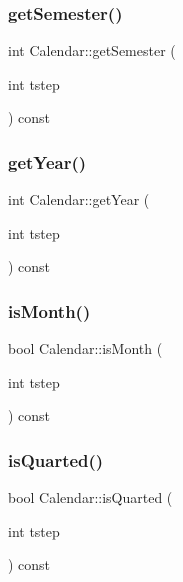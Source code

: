 \subsubsection{\texorpdfstring{getSemester()}{getSemester()}}
{\footnotesize\ttfamily int Calendar\+::get\+Semester (\begin{DoxyParamCaption}\item[{int}]{tstep }\end{DoxyParamCaption}) const\hspace{0.3cm}{\ttfamily [inline]}}

\mbox{\label{class_calendar_afb1819b26af464c2b5219e62a65d79e8}} 
\subsubsection{\texorpdfstring{getYear()}{getYear()}}
{\footnotesize\ttfamily int Calendar\+::get\+Year (\begin{DoxyParamCaption}\item[{int}]{tstep }\end{DoxyParamCaption}) const\hspace{0.3cm}{\ttfamily [inline]}}

\mbox{\label{class_calendar_aef73bffd20f144396d1b034cc59748f7}} 
\subsubsection{\texorpdfstring{isMonth()}{isMonth()}}
{\footnotesize\ttfamily bool Calendar\+::is\+Month (\begin{DoxyParamCaption}\item[{int}]{tstep }\end{DoxyParamCaption}) const\hspace{0.3cm}{\ttfamily [inline]}}

\mbox{\label{class_calendar_ab1078f34e8b23ab76f641ce33a433dbc}} 
\subsubsection{\texorpdfstring{isQuarted()}{isQuarted()}}
{\footnotesize\ttfamily bool Calendar\+::is\+Quarted (\begin{DoxyParamCaption}\item[{int}]{tstep }\end{DoxyParamCaption}) const\hspace{0.3cm}{\ttfamily [inline]}}

